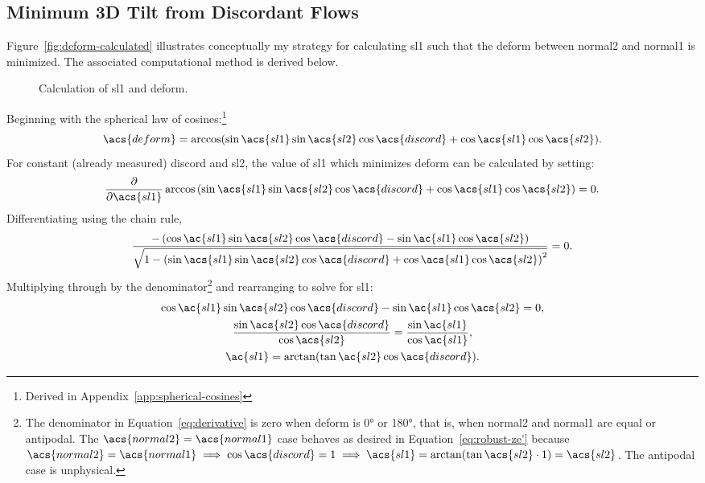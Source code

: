 \subsection{Minimum 3D Tilt from Discordant Flows}\label{sec:3d-deform}
Figure~\ref{fig:deform-calculated} illustrates conceptually my strategy for calculating \acs{sl1} such that the \acf{deform} between \acs{normal2} and \acs{normal1} is minimized. The associated computational method is derived below.
\begin{figure}
    \centering
    
    \caption{Calculation of \acf{sl1} and \acf{deform}.}\label{fig:deform}
\end{figure}
Beginning with the spherical law of cosines:\footnote{Derived in Appendix~\ref{app:spherical-cosines}}
\begin{equation}
    \acs{deform}
    =\arccos(\sin\acs{sl1}\sin\acs{sl2}\cos\acs{discord}
    +\cos\acs{sl1}\cos\acs{sl2}).
    \label{eq:central-angle}
\end{equation}
For constant (already measured) \acs{discord} and \acs{sl2}, the value of \acs{sl1} which minimizes \acs{deform} can be calculated by setting:
\begin{equation}
    \frac{\partial}{\partial \acs{sl1}}
    \arccos\left(\sin\acs{sl1}\sin\acs{sl2}\cos\acs{discord}
    +\cos\acs{sl1}\cos\acs{sl2}\right)
    =0.\label{eq:mimimum}
\end{equation}
Differentiating using the chain rule,
\begin{equation}
    \frac{-\,(\cos\ac{sl1}\sin\acs{sl2}
    \cos\acs{discord}-\sin\ac{sl1}\cos\acs{sl2})}
    {\sqrt{1-{(\sin\acs{sl1}\sin\acs{sl2}\cos\acs{discord}
    +\cos\acs{sl1}\cos\acs{sl2})}^2}}
    =0.\label{eq:derivative}
\end{equation}
Multiplying through by the denominator\footnote{The denominator in Equation~\eqref{eq:derivative} is zero when \acs{deform} is \ang{0} or \ang{180}, that is, when \acs{normal2} and \acs{normal1} are equal or antipodal. The $\acs{normal2}=\acs{normal1}$ case behaves as desired in Equation~\eqref{eq:robust-ze'} because $\acs{normal2}=\acs{normal1}\implies\cos\acs{discord}=1\implies\acs{sl1}=\arctan(\tan\acs{sl2}\cdot1)=\acs{sl2}$. The antipodal case is unphysical.} and rearranging to solve for \acs{sl1}:
\begin{gather}
    \cos\ac{sl1}\sin\acs{sl2}
    \cos\acs{discord}-\sin\ac{sl1}\cos\acs{sl2}
    =0,\nonumber\\
    \frac{\sin\acs{sl2}
    \cos\acs{discord}}
    {\cos\acs{sl2}}
    =\frac{\sin\ac{sl1}}{\cos\ac{sl1}},\nonumber\\
    \ac{sl1}
    =\arctan(\tan\ac{sl2}
    \cos\acs{discord}).
    \label{eq:ze'}
\end{gather}
